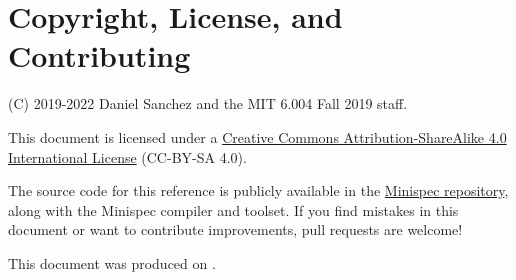 \section{Copyright, License, and Contributing}

(C) 2019-2022 Daniel Sanchez and the MIT 6.004 Fall 2019 staff.

This document is licensed under a \href{http://creativecommons.org/licenses/by-sa/4.0/}{Creative Commons Attribution-ShareAlike 4.0 International License} (CC-BY-SA 4.0).

The source code for this reference is publicly available in the \href{https://github.com/minispec-hdl/minispec/}{Minispec repository},
along with the Minispec compiler and toolset.
If you find mistakes in this document or want to contribute improvements, pull requests are welcome!

This document was produced on .
